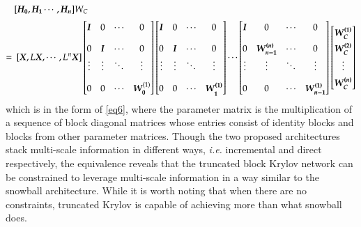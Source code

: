 \documentclass{article}
\newcommand\ie{\textit{i.e.}}
\newcommand{\colvec}[2][1]{%
	\scalebox{#1}{%
		\renewcommand{\arraystretch}{1.45}%
		$\begin{bmatrix}#2\end{bmatrix}$%
	}
}
\begin{document}
\begin{align*}
 &  [\bm{H_0}, \bm{H_1} \cdots,  \bm{H_n}] W_C \\
  =\ &  \ [\bm{X}, L\bm{X}, \cdots,  L^{n} \bm{X}]
\begin{bmatrix}
 \bm{I} & 0 & \cdots & 0 \\[6pt]
 0 & \bm{I} & \cdots & 0 \\[0pt]
 \vdots & \vdots & \ddots  & \vdots\\[6pt]
 0 & 0 & \cdots  & \bm{W_0}^{(1)} \\
\end{bmatrix}
\begin{bmatrix}
\bm{I} & 0 & \cdots & 0 \\[6pt]
0 & \bm{I} & \cdots & 0 \\[0pt]
 \vdots & \vdots & \ddots  & \vdots\\[6pt]
 0 & 0 & \cdots &  \bm{{W_1^{(1)}}} \\
\end{bmatrix}
\cdots
\begin{bmatrix}
 \bm{I} & 0 & \cdots & 0\\[6pt]
 0 & \bm{W_{n-1}^{(n)}} & \cdots & 0 \\[0pt]
 \vdots & \vdots & \ddots & \vdots\\[6pt]
 0 & 0 & \cdots &  \bm{W_{n-1}^{(1)}} \\
\end{bmatrix}
\colvec{ \bm{W_{C}^{(1)}} \\  \bm{W_{C}^{(2)}}\\ \vdots \\  \bm{W_{C}^{(n)}} }
\end{align*}
which is in the form of \eqref{eq6}, where the parameter matrix is the multiplication of a sequence of block diagonal matrices whose entries consist of identity blocks and blocks from other parameter matrices. Though the two proposed architectures stack multi-scale information in different ways, \ie{} incremental and direct respectively, the equivalence reveals that the truncated block Krylov network can be constrained to leverage multi-scale information in a way similar to the snowball architecture. While it is worth noting that when there are no constraints, truncated Krylov is capable of achieving more than what snowball does.
\end{document}
